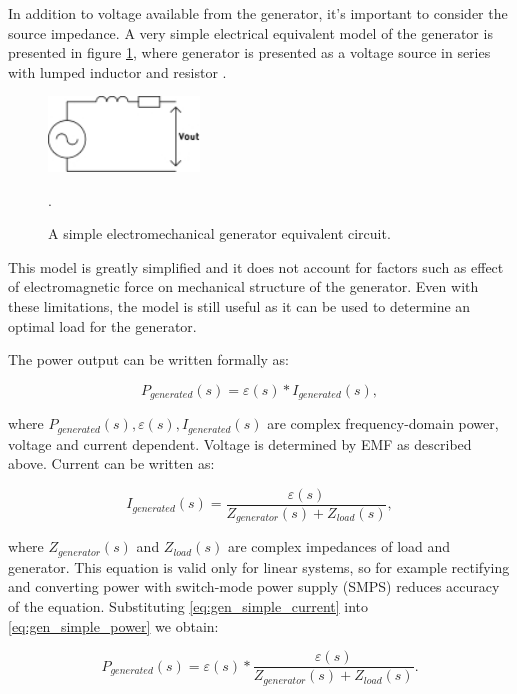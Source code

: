 In addition to voltage available from the generator, it's important to consider the source impedance. A very simple electrical equivalent model of the generator is presented in figure \ref{gen_simple}, where generator is presented as a voltage source in series with lumped inductor and resistor \cite{Jirutitijaroen2012}. 

\begin{figure}[htb]
\begin{center}
\includegraphics[height=2cm]{images/own_dwg/gen_simple}
\end{center}
\caption{A simple electromechanical generator equivalent circuit.}.
\label{gen_simple}
\end{figure}

This model is greatly simplified and it does not account for factors such as effect of electromagnetic force on mechanical structure of the generator. Even with these limitations, the model is still useful as it can be used to determine an optimal load for the generator. 

The power output can be written formally as:

\begin{equation} \label{eq:gen_simple_power}
  P_{generated}(s) = \varepsilon(s)*I_{generated}(s),
\end{equation}

where $P_{generated}(s), \varepsilon(s), I_{generated}(s)$ are complex frequency-domain power, voltage and current dependent. Voltage is determined by EMF as described above. Current can be written as: 

\begin{equation} \label{eq:gen_simple_current}
  I_{generated}(s) = \frac{\varepsilon(s)}{Z_{generator}(s)+Z_{load}(s)},
\end{equation}

where $Z_{generator}(s) $ and $ Z_{load}(s)$ are complex impedances of load and generator. This equation is valid only for linear systems, so for example rectifying and converting power with switch-mode power supply (SMPS) reduces accuracy of the equation. Substituting \eqref{eq:gen_simple_current} into \eqref{eq:gen_simple_power} we obtain:

\begin{equation}
  P_{generated}(s) = \varepsilon(s)*\frac{\varepsilon(s)}{Z_{generator}(s)+Z_{load}(s)}.
\end{equation}

